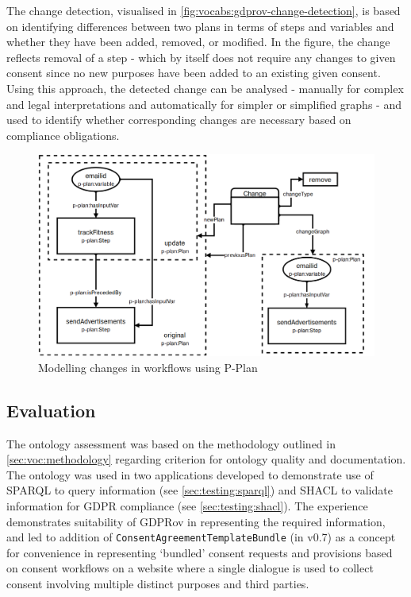 The change detection, visualised in \autoref{fig:vocabs:gdprov-change-detection}, is based on identifying differences between two plans in terms of steps and variables and whether they have been added, removed, or modified.
In the figure, the change reflects removal of a step - which by itself does not require any changes to given consent since no new purposes have been added to an existing given consent.
Using this approach, the detected change can be analysed - manually for complex and legal interpretations and automatically for simpler or simplified graphs - and used to identify whether corresponding changes are necessary based on compliance obligations.
\begin{figure}[htbp]
    \centering
    \includegraphics[width=\textwidth]{img/GDPRov-change-detection.png}
    \caption{Modelling changes in workflows using P-Plan \cite{pandit_gdpr-driven_2018}}
    \label{fig:vocabs:gdprov-change-detection}
\end{figure}

\subsection{Evaluation}\label{sec:voc:gdprov:evaluation}
The ontology assessment was based on the methodology outlined in \autoref{sec:voc:methodology} regarding criterion for ontology quality and documentation.
The ontology was used in two applications developed to demonstrate use of SPARQL to query information (see \autoref{sec:testing:sparql}) and SHACL to validate information for GDPR compliance (see \autoref{sec:testing:shacl}). The experience demonstrates suitability of GDPRov in representing the required information, and led to addition of \texttt{ConsentAgreementTemplateBundle} (in v0.7) as a concept for convenience in representing `bundled' consent requests and provisions based on consent workflows on a website where a single dialogue is used to collect consent involving multiple distinct purposes and third parties.

